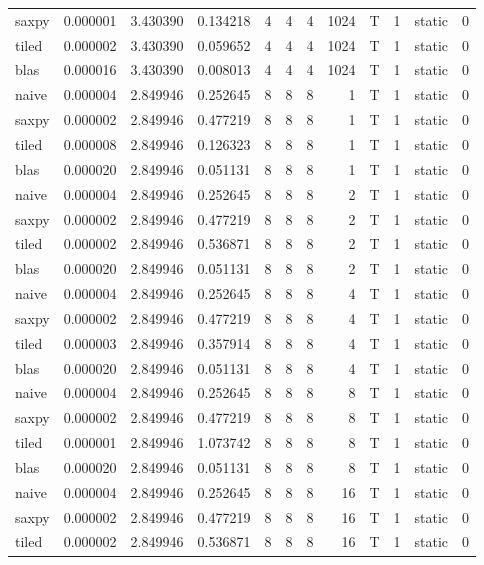\documentclass[
  12pt,
  xcolor = usenames,dvipsnames]{article}
\begin{document}
\begin{table}[!h]
{\begin{tabular}[t]{lrrrrrrrlrlr}
\addlinespace
saxpy & 0.000001 & 3.430390 & 0.134218 & 4 & 4 & 4 & 1024 & T & 1 & static & 0\\
tiled & 0.000002 & 3.430390 & 0.059652 & 4 & 4 & 4 & 1024 & T & 1 & static & 0\\
blas & 0.000016 & 3.430390 & 0.008013 & 4 & 4 & 4 & 1024 & T & 1 & static & 0\\
naive & 0.000004 & 2.849946 & 0.252645 & 8 & 8 & 8 & 1 & T & 1 & static & 0\\
saxpy & 0.000002 & 2.849946 & 0.477219 & 8 & 8 & 8 & 1 & T & 1 & static & 0\\
\addlinespace
tiled & 0.000008 & 2.849946 & 0.126323 & 8 & 8 & 8 & 1 & T & 1 & static & 0\\
blas & 0.000020 & 2.849946 & 0.051131 & 8 & 8 & 8 & 1 & T & 1 & static & 0\\
naive & 0.000004 & 2.849946 & 0.252645 & 8 & 8 & 8 & 2 & T & 1 & static & 0\\
saxpy & 0.000002 & 2.849946 & 0.477219 & 8 & 8 & 8 & 2 & T & 1 & static & 0\\
tiled & 0.000002 & 2.849946 & 0.536871 & 8 & 8 & 8 & 2 & T & 1 & static & 0\\
\addlinespace
blas & 0.000020 & 2.849946 & 0.051131 & 8 & 8 & 8 & 2 & T & 1 & static & 0\\
naive & 0.000004 & 2.849946 & 0.252645 & 8 & 8 & 8 & 4 & T & 1 & static & 0\\
saxpy & 0.000002 & 2.849946 & 0.477219 & 8 & 8 & 8 & 4 & T & 1 & static & 0\\
tiled & 0.000003 & 2.849946 & 0.357914 & 8 & 8 & 8 & 4 & T & 1 & static & 0\\
blas & 0.000020 & 2.849946 & 0.051131 & 8 & 8 & 8 & 4 & T & 1 & static & 0\\
\addlinespace
naive & 0.000004 & 2.849946 & 0.252645 & 8 & 8 & 8 & 8 & T & 1 & static & 0\\
saxpy & 0.000002 & 2.849946 & 0.477219 & 8 & 8 & 8 & 8 & T & 1 & static & 0\\
tiled & 0.000001 & 2.849946 & 1.073742 & 8 & 8 & 8 & 8 & T & 1 & static & 0\\
blas & 0.000020 & 2.849946 & 0.051131 & 8 & 8 & 8 & 8 & T & 1 & static & 0\\
naive & 0.000004 & 2.849946 & 0.252645 & 8 & 8 & 8 & 16 & T & 1 & static & 0\\
\addlinespace
saxpy & 0.000002 & 2.849946 & 0.477219 & 8 & 8 & 8 & 16 & T & 1 & static & 0\\
tiled & 0.000002 & 2.849946 & 0.536871 & 8 & 8 & 8 & 16 & T & 1 & static & 0\\

\end{tabular}}
\end{table}
\end{document}
